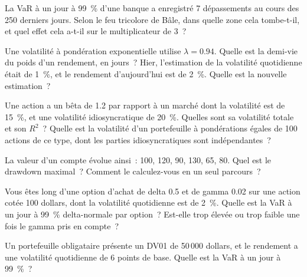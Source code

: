 \begin{question}\label{iq:iv2:risk-validation-and-regulation:5}
La VaR à un jour à 99~\% d'une banque a enregistré 7 dépassements au cours des 250 derniers jours. Selon le feu tricolore de Bâle, dans quelle zone cela tombe-t-il, et quel effet cela a-t-il sur le multiplicateur de 3~?
\end{question}

\begin{question}\label{iq:iv2:risk-validation-and-regulation:6}
Une volatilité à pondération exponentielle utilise $\lambda = 0.94$. Quelle est la demi-vie du poids d'un rendement, en jours~? Hier, l'estimation de la volatilité quotidienne était de 1~\%, et le rendement d'aujourd'hui est de 2~\%. Quelle est la nouvelle estimation~?
\end{question}

\begin{question}\label{iq:iv2:risk-validation-and-regulation:7}
Une action a un bêta de 1.2 par rapport à un marché dont la volatilité est de 15~\%, et une volatilité idiosyncratique de 20~\%. Quelles sont sa volatilité totale et son $R^2$~? Quelle est la volatilité d'un portefeuille à pondérations égales de 100 actions de ce type, dont les parties idiosyncratiques sont indépendantes~?
\end{question}

\begin{question}\label{iq:iv2:risk-validation-and-regulation:8}
La valeur d'un compte évolue ainsi~: 100, 120, 90, 130, 65, 80. Quel est le drawdown maximal~? Comment le calculez-vous en un seul parcours~?
\end{question}

\begin{question}\label{iq:iv2:risk-validation-and-regulation:9}
Vous êtes long d'une option d'achat de delta 0.5 et de gamma 0.02 sur une action cotée 100 dollars, dont la volatilité quotidienne est de 2~\%. Quelle est la VaR à un jour à 99~\% delta-normale par option~? Est-elle trop élevée ou trop faible une fois le gamma pris en compte~?
\end{question}

\begin{question}\label{iq:iv2:risk-validation-and-regulation:10}
Un portefeuille obligataire présente un DV01 de 50\,000 dollars, et le rendement a une volatilité quotidienne de 6 points de base. Quelle est la VaR à un jour à 99~\%~?
\end{question}

